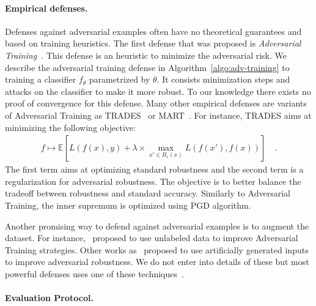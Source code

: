 \paragraph{Empirical defenses.} Defenses against adversarial examples often have no theoretical guarantees and based on training heuristics. The first defense that was proposed is \emph{Adversarial Training}~\citep{goodfellow2014explaining,madry2018towards}. This defense is an heuristic to minimize the adversarial risk. We describe the adversarial training defense in Algorithm~\ref{algo:adv-training} to training a classifier $f_\theta$ parametrized by $\theta$. It consists minimization steps and attacks on the classifier to make it more robust. To our knowledge there exists no proof of convergence for this defense. Many other empirical defenses are variants of Adversarial Training as TRADES~\citep{zhang2019theoretically} or MART~\citep{wang2019improving}. For instance, TRADES aims at minimizing the following objective:
\begin{align*}
  f\mapsto\mathbb{E}\left[L(f(x),y)+\lambda\times\max_{x'\in B_\varepsilon(x)}L(f(x'),f(x))\right]\quad.
\end{align*}
The first term aims at optimizing standard robustness and the second term is a regularization for adversarial robustness. The objective is to better balance the tradeoff between robustness and standard accuracy. Similarly to Adversarial Training, the inner supremum is optimized using PGD algorithm.

Another promising way to defend against adversarial examples is to augment the dataset. For instance,~\cite{carmon2019unlabeled,rebuffi2021fixing} proposed to use unlabeled data to improve Adversarial Training strategies. Other works as~\citep{wang2019improving} proposed to use artificially generated inputs to improve adversarial robustness. We do not enter into details of these but most powerful defenses uses one of these techniques~\citep{croce2020robustbench}.



\paragraph{Evaluation Protocol.}

